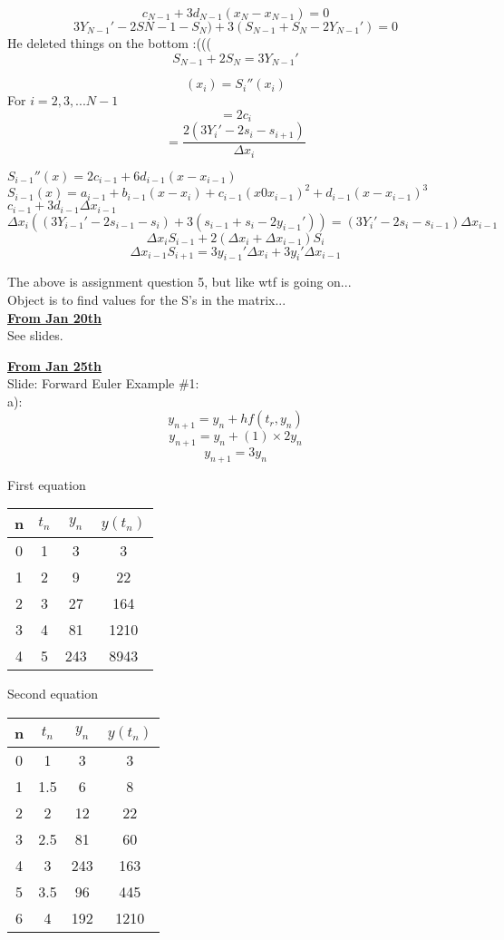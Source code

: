 \documentclass[12pt]{article}
\newcommand{\myt}[1]{\textbf{\underline{#1}}}
\begin{document}
	$$c_{N-1} + 3d_{N-1}(x_N - x_{N-1}) = 0$$
	$$3Y_{N-1}' - 2S{N-1} - S_N) + 3(S_{N-1} + S_N - 2Y_{N-1}') = 0$$
	He deleted things on the bottom :(((\\
	$$S_{N-1} + 2S_{N} = 3Y_{N-1}'$$
	
	$$(x_i) = S_i''(x_i)$$
	For $i = 2,3,...N-1$\\
	$$= 2c_i$$
	$$= \frac{2(3Y_i' - 2s_i - s_{i+1})}{\Delta x_i}$$
	
	$S_{i-1}''(x) = 2c_{i-1} + 6d_{i-1}(x-x_{i-1})$\\
	$S_{i-1}(x) = a_{i-1} + b_{i-1}(x-x_i) + c_{i-1}(x0x_{i-1})^2 + d_{i-1}(x-x_{i-1})^3$\\
	
	$c_{i-1} + 3d_{i-1}\Delta x_{i-1}$\\
	$$\Delta x_i((3Y_{i-1}' - 2s_{i-1}-s_{i}) + 3(s_{i-1} + s_i - 2y_{i-1}')) = (3Y_i' - 2s_i - s_{i-1})\Delta x_{i-1}$$
	$$\Delta x_iS_{i-1} + 2(\Delta x_i + \Delta x_{i-1})S_i$$
	$$\Delta x_{i-1}S_{i+1} = 3y_{i-1}'\Delta x_i + 3y_i'\Delta x_{i-1}$$
	
	The above is assignment question 5, but like wtf is going on...\\
	Object is to find values for the S's in the matrix...\\
	
	\myt{From Jan 20th}\\
	
	See slides.
	
	\myt{From Jan 25th}\\
	
	Slide: Forward Euler Example \#1:\\
	
	a):\\
	
	$$y_{n+1} = y_n + hf(t_r,y_n)$$
	$$y_{n+1} = y_{n} + (1) \times 2y_n$$
	$$y_{n+1} = 3y_n$$
	
	First equation\\
	\begin{tabular}{c | c c c }
		n & $t_n$ & $y_n$ & $y(t_n)$\\ \hline
		0 & 1 & 3 & 3\\
		1 & 2 & 9 & 22\\
		2 & 3 & 27 & 164\\
		3 & 4 & 81 & 1210\\
		4 & 5 & 243 & 8943\\
	\end{tabular}


	Second equation\\
	\begin{tabular}{c | c c c }
		n & $t_n$ & $y_n$ & $y(t_n)$\\ \hline
		0 & 1 & 3 & 3\\
		1 & 1.5 & 6 & 8\\
		2 & 2 & 12 & 22\\
		3 & 2.5 & 81 & 60\\
		4 & 3 & 243 & 163\\
		5 & 3.5 & 96 & 445\\
		6 & 4 & 192 & 1210 \\
	\end{tabular}
\end{document}
